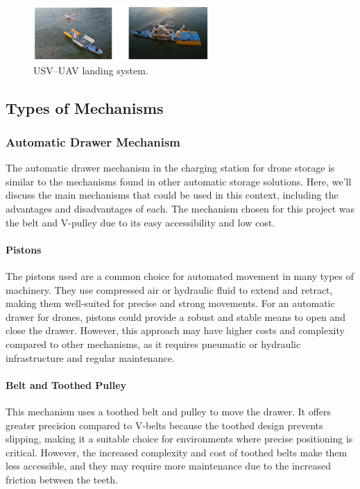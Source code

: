     \begin{figure}[h!]
        \centering
        \includegraphics[width=0.6\textwidth]{pictures/mobile_3.png}
        \caption{USV–UAV landing system.}
        \label{fig:mobile_charging}
    \end{figure}


\subsection{Types of Mechanisms}
    \subsubsection{Automatic Drawer Mechanism}
    The automatic drawer mechanism in the charging station for drone storage is similar to the mechanisms found in other automatic storage solutions. Here, we'll discuss the main mechanisms that could be used in this context, including the advantages and disadvantages of each. The mechanism chosen for this project was the belt and V-pulley due to its easy accessibility and low cost.
    
    \paragraph{Pistons} The pistons used are a common choice for automated movement in many types of machinery. They use compressed air or hydraulic fluid to extend and retract, making them well-suited for precise and strong movements. For an automatic drawer for drones, pistons could provide a robust and stable means to open and close the drawer. However, this approach may have higher costs and complexity compared to other mechanisms, as it requires pneumatic or hydraulic infrastructure and regular maintenance.
    
    \paragraph{Belt and Toothed Pulley} This mechanism uses a toothed belt and pulley to move the drawer. It offers greater precision compared to V-belts because the toothed design prevents slipping, making it a suitable choice for environments where precise positioning is critical. However, the increased complexity and cost of toothed belts make them less accessible, and they may require more maintenance due to the increased friction between the teeth.
    
